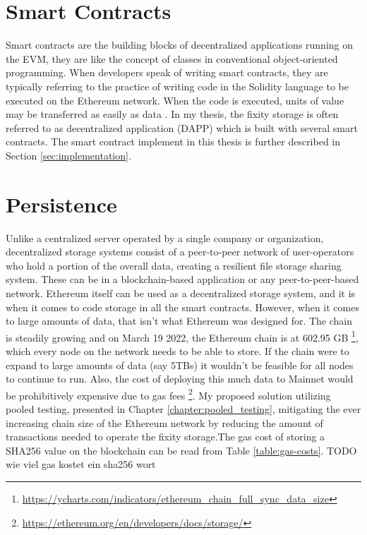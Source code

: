 \section{Smart Contracts}
Smart contracts are the building blocks of decentralized applications running on the EVM, they are like the concept of classes in conventional object-oriented programming. When developers speak of writing smart contracts, they are typically referring to the practice of writing code in the Solidity language to be executed on the Ethereum network. When the code is executed, units of value may be transferred as easily as data \cite[10]{dannen2017introducing}.
In my thesis, the fixity storage is often referred to as decentralized application (DAPP) which is built with several smart contracts. The smart contract implement in this thesis is further described in Section \ref{sec:implementation}. 

\section{Persistence}
Unlike a centralized server operated by a single company or organization, decentralized storage systems consist of a peer-to-peer network of user-operators who hold a portion of the overall data, creating a resilient file storage sharing system. These can be in a blockchain-based application or any peer-to-peer-based network. Ethereum itself can be used as a decentralized storage system, and it is when it comes to code storage in all the smart contracts. However, when it comes to large amounts of data, that isn't what Ethereum was designed for. The chain is steadily growing and on March 19 2022, the Ethereum chain is at 602.95 GB \footnote{\url{https://ycharts.com/indicators/ethereum_chain_full_sync_data_size}}, which every node on the network needs to be able to store. If the chain were to expand to large amounts of data (say 5TBs) it wouldn't be feasible for all nodes to continue to run. Also, the cost of deploying this much data to Mainnet would be prohibitively expensive due to gas fees \footnote{\url{https://ethereum.org/en/developers/docs/storage/}}.
My proposed solution utilizing pooled testing, presented in Chapter \ref{chapter:pooled_testing}, mitigating the ever increasing chain size of the Ethereum network by reducing the amount of transactions needed to operate the fixity storage.The gas cost of storing a SHA256 value on the blockchain can be read from Table \ref{table:gas-costs}. TODO wie viel gas kostet ein sha256 wort



